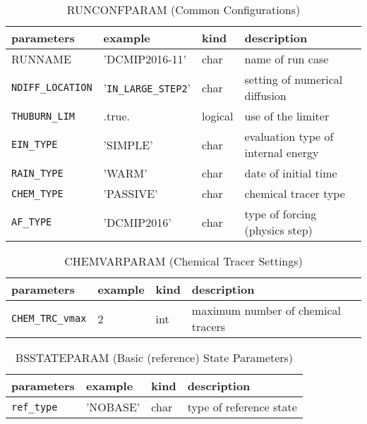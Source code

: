 \documentclass[a4paper]{article}
\begin{document}
\begin{table}[htb]
\begin{center}
\caption{RUNCONFPARAM (Common Configurations)}
\begin{tabularx}{150mm}{|l|l|l|X|} \hline
 \rowcolor[gray]{0.9} parameters & example & kind & description          \\ \hline
 RUNNAME               & 'DCMIP2016-11'   & char & name of run case \\ \hline
 \verb|NDIFF_LOCATION|        & '\verb|IN_LARGE_STEP2|' & char  & setting of numerical diffusion \\ \hline
 \verb|THUBURN_LIM|           & .true.      & logical & use of the limiter \\ \hline
 \verb|EIN_TYPE|              & 'SIMPLE'    & char  & evaluation type of internal energy \\ \hline
 \verb|RAIN_TYPE|             & 'WARM'      & char & date of initial time \\ \hline
 \verb|CHEM_TYPE|             & 'PASSIVE'   & char & chemical tracer type \\ \hline
 \verb|AF_TYPE|               & 'DCMIP2016' & char & type of forcing (physics step) \\ \hline
\end{tabularx}
\end{center}
\end{table}

\begin{table}[htb]
\begin{center}
\caption{CHEMVARPARAM (Chemical Tracer Settings)}
\begin{tabularx}{150mm}{|l|l|l|X|} \hline
 \rowcolor[gray]{0.9} parameters & example & kind & description          \\ \hline
 \verb|CHEM_TRC_vmax| & 2 & int &  maximum number of chemical tracers \\ \hline
\end{tabularx}
\end{center}
\end{table}

\begin{table}[htb]
\begin{center}
\caption{BSSTATEPARAM (Basic (reference) State Parameters)}
\begin{tabularx}{150mm}{|l|l|l|X|} \hline
 \rowcolor[gray]{0.9} parameters & example & kind & description          \\ \hline
 \verb|ref_type| & 'NOBASE' & char & type of reference state \\ \hline
\end{tabularx}
\end{center}
\end{table}
\end{document}

